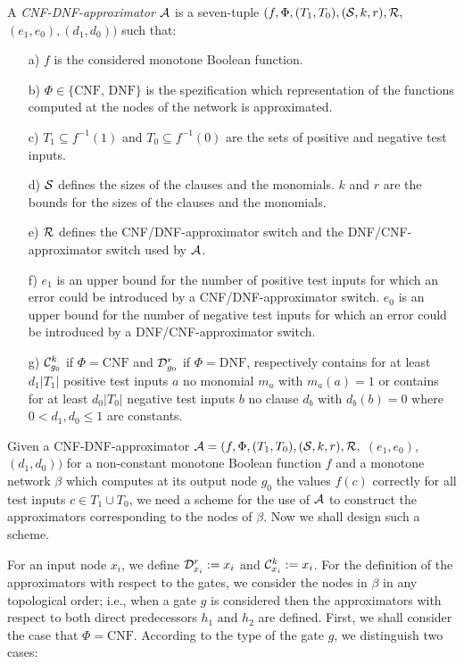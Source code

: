 \documentclass[11pt]{article}
\begin{document}
A {\em CNF-DNF-approximator ${\cal A}$\/} is a seven-tuple $(f,\Phi,(T_1,T_0),({\cal S},k,r),{\cal R},$ $(e_1, e_0),
(d_1,d_0))$ such that:
\begin{itemize}
\item[a)]
  $f$ is the considered monotone Boolean function.
\item[b)]
  $\Phi \in \{\mbox{CNF, DNF}\}$ is the spezification which representation of the functions computed at the nodes of
  the network is approximated.
\item[c)]
  $T_1 \subseteq f^{-1}(1)$ and $T_0 \subseteq f^{-1}(0)$ are the sets of positive and negative test inputs.
\item[d)]
  ${\cal S}$ defines the sizes of the clauses and the monomials.
  $k$ and $r$ are the bounds for the sizes of the clauses and the monomials.
\item[e)]
  ${\cal R}$ defines the CNF/DNF-approximator switch and the DNF/CNF-approximator switch used by ${\cal A}$.
\item[f)]
  $e_1$ is an upper bound for the number of positive test inputs for which an error could be introduced by a
  CNF/DNF-approximator switch. 
  $e_0$ is an upper bound for the number of negative test inputs for which an error could be introduced by a
  DNF/CNF-approximator switch. 
\item[g)]
  ${\cal C}_{g_0}^k$ if $\Phi = \mbox{CNF}$ and ${\cal D}_{g_0}^r$ if $\Phi = \mbox{DNF}$, respectively
  contains for at least $d_1|T_1|$ positive test inputs $a$ no monomial $m_a$ with $m_a(a) = 1$
  or contains for at least $d_0|T_0|$ negative test inputs $b$ no clause $d_b$ with $d_b(b) = 0$ where
  $0 < d_1,d_0 \leq 1$ are constants. 
\end{itemize}

Given a CNF-DNF-approximator ${\cal A} = (f,\Phi,(T_1,T_0),({\cal S},k,r),{\cal R},$ $(e_1, e_0),$ $(d_1,d_0))$ for a
non-constant monotone Boolean function $f$ and a monotone network
$\beta$ which computes at its output node $g_0$ the values $f(c)$ correctly for all test inputs
$c \in T_1 \cup T_0$, we need a scheme for the use of ${\cal A}$ to construct the approximators corresponding to the
nodes of $\beta$. Now we shall design such a scheme.

For an input node $x_i$, we define ${\cal D}_{x_i}^r := x_i$ and ${\cal C}_{x_i}^k := x_i$. For the definition of
the approximators with respect to the gates, we consider the nodes in $\beta$ in any topological order; i.e., when
a gate $g$ is considered then the approximators with respect to both direct predecessors $h_1$ and $h_2$ are defined.
First, we shall consider the case that $\Phi =  \mbox{CNF}$. According to the type of the gate $g$, we distinguish
two cases:
\end{document}
